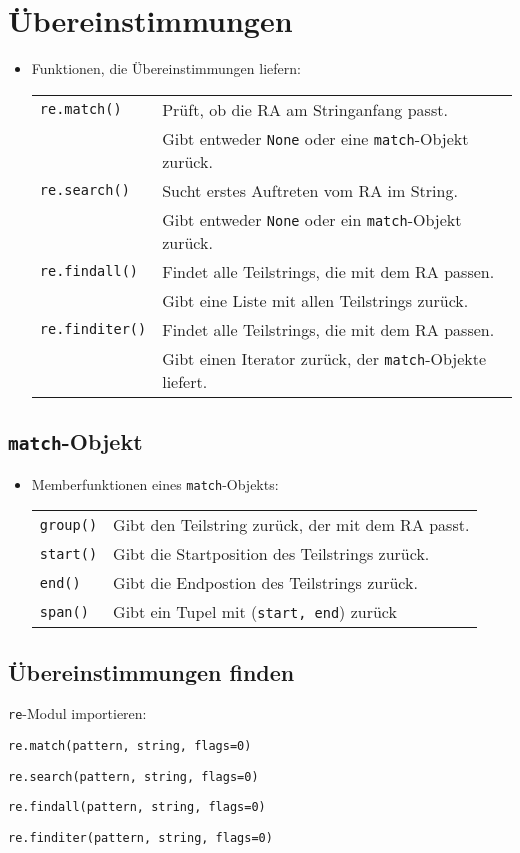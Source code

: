 \section{Übereinstimmungen}
\begin{itemize}
	\item Funktionen, die Übereinstimmungen liefern:\\
	\begin{tabular}{ll}
		\texttt{re.match()}& Prüft, ob die RA am Stringanfang passt.\\
		& Gibt entweder \texttt{None} oder eine \texttt{match}-Objekt zurück.\\
		\texttt{re.search()}& Sucht erstes Auftreten vom RA im String.\\
		& Gibt entweder \texttt{None} oder ein \texttt{match}-Objekt zurück.\\
		\texttt{re.findall()}& Findet alle Teilstrings, die mit dem RA passen.\\
		& Gibt eine Liste mit allen Teilstrings zurück.\\
		\texttt{re.finditer()}& Findet alle Teilstrings, die mit dem RA passen.\\
		& Gibt einen Iterator zurück, der \texttt{match}-Objekte liefert.\\
	\end{tabular}
\end{itemize}
	
\subsection{\texttt{match}-Objekt}
\begin{itemize}
	\item Memberfunktionen eines \texttt{match}-Objekts:\\
	\begin{tabular}{ll}
		\texttt{group()}& Gibt den Teilstring zurück, der mit dem RA passt.\\
		\texttt{start()}& Gibt die Startposition des Teilstrings zurück.\\
		\texttt{end()}& Gibt die Endpostion des Teilstrings zurück.\\
		\texttt{span()}& Gibt ein Tupel mit (\texttt{start, end}) zurück
	\end{tabular}
\end{itemize}

\subsection{Übereinstimmungen finden}
\texttt{re}-Modul importieren:

\texttt{re.match(pattern, string, flags=0)}

\texttt{re.search(pattern, string, flags=0)}

\texttt{re.findall(pattern, string, flags=0)}

\texttt{re.finditer(pattern, string, flags=0)}


